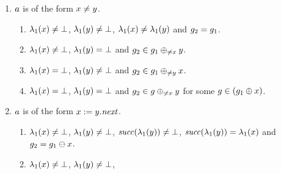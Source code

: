 {\begin{enumerate}
\begin{enumerate}
\begin{enumerate}
    $\labeling_1(\xvar)=\labeling_1(\yvar)$ and
    $\graph_2=\graph_1\delVar{\xvar}$.
  \item \label{pre:case:assignedB}%
    $\labeling_1(\xvar)\neq\undef$, %
    $\labeling_1(\yvar)=\undef$ and
    $\graph_2=\graph\delVar\xvar$ where $\graph\addEqVar{\xvar}{\yvar}$.
  \item \label{pre:case:assignedC}%
    $\labeling_1(\xvar)=\undef$, %
    $\labeling_1(\yvar)\nequals\undef$ and %
    $\graph_2=\graph_1$.
  \item \label{pre:case:assignedD}%
    $\labeling_1(\xvar)=\undef$, %
    $\labeling_1(\yvar)\equals\undef$ and %
    $\graph_2\in\graph_1\addVar{\yvar}$.
  \end{enumerate}
\item $a$ is of the form $x\neq y$.
  \begin{enumerate}
  \item \label{pre:case:notEqualsA}%
    $\lambda_1(x)\neq\bot$, %
    $\labeling_1(\yvar)\nequals\undef$, %
    $\lambda_1(x)\neq\lambda_1(y)$ and $\graph_2=\graph_1$.
  \item \label{pre:case:notEqualsB}%
    $\labeling_1(\xvar)\neq\undef$, %
    $\labeling_1(\yvar)=\undef$ and %
    $g_2\in g_1\oplus_{\neq{\ensuremath{x}}}{y}$.
  \item \label{pre:case:notEqualsC}%
    $\labeling_1(\xvar)=\undef$, %
    $\lambda_1(y)\neq\bot$ and %
    $g_2\in g_1\oplus_{\neq{\ensuremath{y}}}{x}$.
  \item \label{pre:case:notEqualsD}%
    $\labeling_1(\xvar)=\undef$, %
    $\labeling_1(\yvar)=\undef$ and %
    $g_2\in g\oplus_{\neq{\ensuremath{x}}}{y}$ for some
    $g\in\left(g_1\oplus{\ensuremath{x}}\right)$.
  \end{enumerate}
\item $a$ is of the form $x:=y.{\it next}$.
%
  \begin{enumerate}
  \item \label{pre:case:assignedDotNextA}%
    $\labeling_1(\xvar)\neq\undef$, %
    $\lambda_1(y)\neq\bot$, %
    ${\it succ}(\lambda_1(y))\neq\bot$, %
    ${\it succ}(\lambda_1(y))=\lambda_1(x)$ and
    $\graph_2=\graph_1\delVar{\xvar}$.
  \item \label{pre:case:assignedDotNextB}%
    $\labeling_1(\xvar)\neq\undef$, %
    $\lambda_1(y)\neq\bot$, %

\end{enumerate}
\end{enumerate}
\end{enumerate}}
